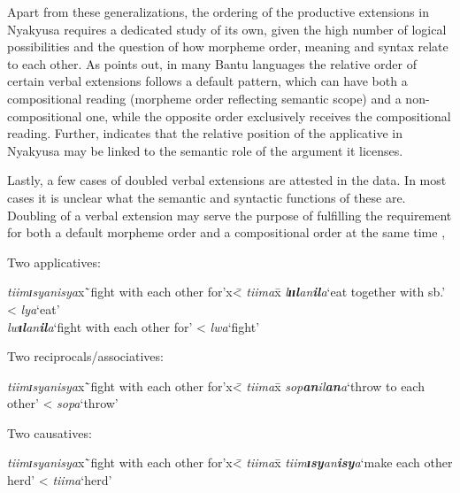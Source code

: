 Apart from these generalizations, the ordering of the productive extensions in Nyakyusa requires a dedicated study of its own, given the high number of logical possibilities and the question of how morpheme order, meaning and syntax relate to each other. As \citet{HymanL2002} points out, in many Bantu languages the relative order of certain verbal extensions follows a default pattern, which can have both a compositional reading (morpheme order reflecting semantic scope) and a non-compositional one, while the opposite order exclusively receives the compositional reading. Further, \citet{LusekeloA2013} indicates that the relative position of the applicative in Nyakyusa may be linked to the semantic role of the argument it licenses.

Lastly, a few cases of doubled verbal extensions are attested in the data. In most cases it is unclear what the semantic and syntactic functions of these are. Doubling of a verbal extension may serve the purpose of fulfilling the requirement for both a default morpheme order and a compositional order at the same time \citep{HymanL2002}, 
\begin{exe}
\ex \label{exExtensionDoubling}\begin{xlist}
\ex Two applicatives:
\begin{tabbing}
\textit{tiimɪsyanisya}x\=`fight with each other for'x\= < \textit{tiima}x\=\kill
\textit{l\textbf{ɪɪl}an\textbf{il}a}\>`eat together with sb.' \> < \textit{lya}\>`eat'\\
\textit{lw\textbf{ɪl}an\textbf{il}a}\>`fight with each other for'\> < \textit{lwa}\>`fight'
\end{tabbing}
\ex Two reciprocals/associatives:
\begin{tabbing}
\textit{tiimɪsyanisya}x\=`fight with each other for'x\= < \textit{tiima}x\=\kill
\textit{sop\textbf{an}il\textbf{an}a}\>`throw to each other'\> < \textit{sopa}\>`throw' %
\end{tabbing}
\ex Two causatives:
\begin{tabbing}
\textit{tiimɪsyanisya}x\=`fight with each other for'x\= < \textit{tiima}x\=\kill
\textit{tiim\textbf{ɪsy}an\textbf{isy}a}\>\lq make each other herd'\footnotemark \> < \textit{tiima}\>\lq herd'
\end{tabbing}
\end{xlist}
\end{exe}
\protect{}
\label{ReciprocalAndCausative}
